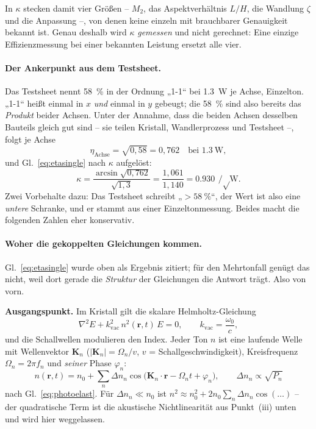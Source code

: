 \documentclass[11pt,a4paper]{article}
\begin{document}
\medskip
\noindent In $\kappa$ stecken damit vier Größen -- $M_2$, das
Aspektverhältnis $L/H$, die Wandlung $\zeta$ und die Anpassung --, von denen
keine einzeln mit brauchbarer Genauigkeit bekannt ist. Genau deshalb wird
$\kappa$ \emph{gemessen} und nicht gerechnet: Eine einzige Effizienzmessung
bei einer bekannten Leistung ersetzt alle vier.

\paragraph{Der Ankerpunkt aus dem Testsheet.}
Das Testsheet nennt \SI{58}{\percent} in der Ordnung „1-1`` bei
\SI{1.3}{\watt} je Achse, Einzelton. „1-1`` heißt einmal in $x$ \emph{und}
einmal in $y$ gebeugt; die \SI{58}{\percent} sind also bereits das
\emph{Produkt} beider Achsen. Unter der Annahme, dass die beiden Achsen
desselben Bauteils gleich gut sind -- sie teilen Kristall, Wandlerprozess und
Testsheet --, folgt je Achse
\begin{equation}
  \eta_\mathrm{Achse} = \sqrt{0{,}58} = 0{,}762 \quad\text{bei } \SI{1.3}{\watt},
\end{equation}
und Gl.~\eqref{eq:etasingle} nach $\kappa$ aufgelöst:
\begin{equation}
  \kappa = \frac{\arcsin\sqrt{0{,}762}}{\sqrt{1{,}3}}
         = \frac{1{,}061}{1{,}140} = \SI{0.930}{\per\sqrt\watt}.
  \label{eq:kappa}
\end{equation}
Zwei Vorbehalte dazu: Das Testsheet schreibt „$>\SI{58}{\percent}$``, der
Wert ist also eine \emph{untere} Schranke, und er stammt aus einer
Einzeltonmessung. Beides macht die folgenden Zahlen eher konservativ.

\paragraph{Woher die gekoppelten Gleichungen kommen.}
Gl.~\eqref{eq:etasingle} wurde oben als Ergebnis zitiert; für den
Mehrtonfall genügt das nicht, weil dort gerade die \emph{Struktur} der
Gleichungen die Antwort trägt. Also von vorn.

\medskip
\noindent\textbf{Ausgangspunkt.} Im Kristall gilt die skalare
Helmholtz-Gleichung
\begin{equation}
  \nabla^2 E + k_\mathrm{vac}^2\,n^2(\mathbf{r},t)\,E = 0 ,
  \qquad k_\mathrm{vac} = \frac{\omega_0}{c} ,
\end{equation}
und die Schallwellen modulieren den Index. Jeder Ton $n$ ist eine laufende
Welle mit Wellenvektor $\mathbf{K}_n$ ($|\mathbf{K}_n| = \Omega_n/v$,
$v$ = Schallgeschwindigkeit), Kreisfrequenz $\Omega_n = 2\pi f_n$ und
\emph{seiner} Phase $\varphi_n$:
\begin{equation}
  n(\mathbf{r},t) = n_0 + \sum_n \Delta n_n
    \cos\!\bigl(\mathbf{K}_n\!\cdot\!\mathbf{r} - \Omega_n t + \varphi_n\bigr),
  \qquad \Delta n_n \propto \sqrt{P_n}
\end{equation}
nach Gl.~\eqref{eq:photoelast}. Für $\Delta n_n\ll n_0$ ist
$n^2 \approx n_0^2 + 2n_0\sum_n\Delta n_n\cos(\dots)$ -- der quadratische
Term ist die akustische Nichtlinearität aus Punkt~(iii) unten und wird hier
weggelassen.
\end{document}
